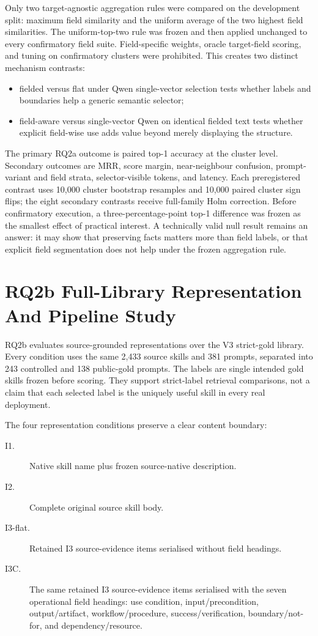 Only two target-agnostic aggregation rules were compared on the development split: maximum field similarity and the uniform average of the two highest field similarities. The uniform-top-two rule was frozen and then applied unchanged to every confirmatory field suite. Field-specific weights, oracle target-field scoring, and tuning on confirmatory clusters were prohibited. This creates two distinct mechanism contrasts:

\begin{itemize}
  \item fielded versus flat under Qwen single-vector selection tests whether labels and boundaries help a generic semantic selector;
  \item field-aware versus single-vector Qwen on identical fielded text tests whether explicit field-wise use adds value beyond merely displaying the structure.
\end{itemize}

The primary RQ2a outcome is paired top-1 accuracy at the cluster level. Secondary outcomes are MRR, score margin, near-neighbour confusion, prompt-variant and field strata, selector-visible tokens, and latency. Each preregistered contrast uses 10,000 cluster bootstrap resamples and 10,000 paired cluster sign flips; the eight secondary contrasts receive full-family Holm correction. Before confirmatory execution, a three-percentage-point top-1 difference was frozen as the smallest effect of practical interest. A technically valid null result remains an answer: it may show that preserving facts matters more than field labels, or that explicit field segmentation does not help under the frozen aggregation rule.

\section{RQ2b Full-Library Representation And Pipeline Study}

RQ2b evaluates source-grounded representations over the V3 strict-gold library. Every condition uses the same 2,433 source skills and 381 prompts, separated into 243 controlled and 138 public-gold prompts. The labels are single intended gold skills frozen before scoring. They support strict-label retrieval comparisons, not a claim that each selected label is the uniquely useful skill in every real deployment.

The four representation conditions preserve a clear content boundary:

\begin{description}
  \item[I1.] Native skill name plus frozen source-native description.
  \item[I2.] Complete original source skill body.
  \item[I3-flat.] Retained I3 source-evidence items serialised without field headings.
  \item[I3C.] The same retained I3 source-evidence items serialised with the seven operational field headings: use condition, input/precondition, output/artifact, workflow/procedure, success/verification, boundary/not-for, and dependency/resource.
\end{description}


